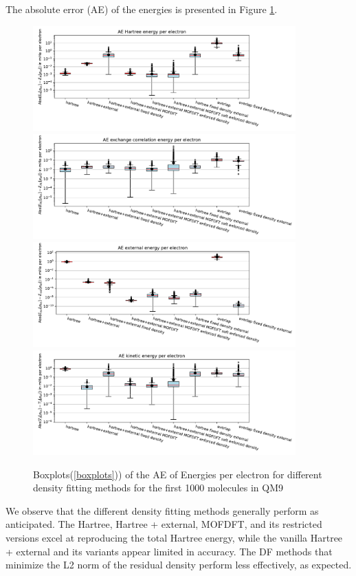 The absolute error (AE) of the energies is presented in Figure
\ref{fig:AE_energies}.
\begin{figure}
    \centering
    \includegraphics[width=0.9\textwidth]{chapters/results/results_images/AE_hartree_energy_on_even_tempered_2.5_for_different_df_methods}
    \includegraphics[width=0.9\textwidth]{chapters/results/results_images/AE_xc_energy_on_even_tempered_2.5_for_different_df_methods}
    \includegraphics[width=0.9\textwidth]{chapters/results/results_images/AE_ext_energy_on_even_tempered_2.5_for_different_df_methods}
    \includegraphics[width=0.9\textwidth]{chapters/results/results_images/AE_kin_energy_on_even_tempered_2.5_for_different_df_methods}
        \caption{Boxplots(\ref{boxplots})) of the AE of Energies per electron for different density fitting methods for the first 1000 molecules in QM9}
    \label{fig:AE_energies}
\end{figure}
We observe that the different density fitting methods generally perform as anticipated. The Hartree, Hartree + external, MOFDFT, and its restricted versions excel at reproducing the total Hartree energy, while the vanilla Hartree + external and its variants appear limited in accuracy. The DF methods that minimize the L2 norm of the residual density perform less effectively, as expected.

